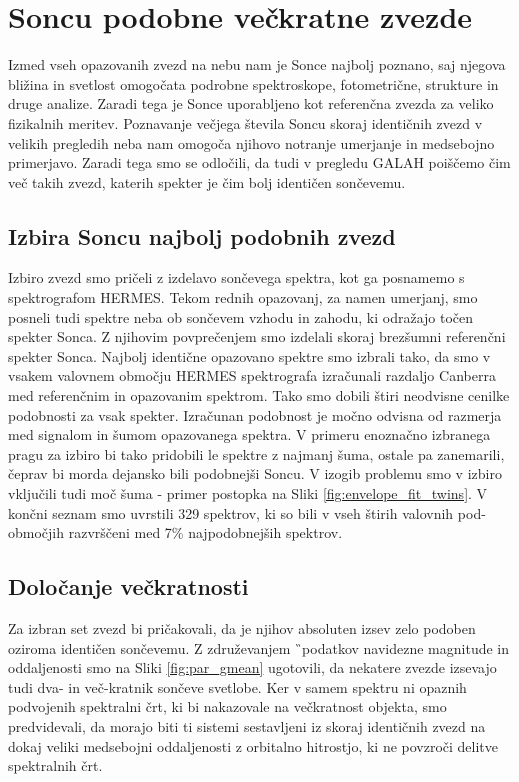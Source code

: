 \section{Soncu podobne večkratne zvezde}
\label{sec:slo_soncevi_veckratniki}
Izmed vseh opazovanih zvezd na nebu nam je Sonce najbolj poznano, saj njegova bližina in svetlost omogočata podrobne spektroskope, fotometrične, strukture in druge analize. Zaradi tega je Sonce uporabljeno kot referenčna zvezda za veliko fizikalnih meritev. Poznavanje večjega števila Soncu skoraj identičnih zvezd v velikih pregledih neba nam omogoča njihovo notranje umerjanje \cite{2010A&A...522A..98M, 2012MNRAS.426..484D} in medsebojno primerjavo. Zaradi tega smo se odločili, da tudi v pregledu GALAH poiščemo čim več takih zvezd, katerih spekter je čim bolj identičen sončevemu.

\subsection{Izbira Soncu najbolj podobnih zvezd}
Izbiro zvezd smo pričeli z izdelavo sončevega spektra, kot ga posnamemo s spektrografom HERMES. Tekom rednih opazovanj, za namen umerjanj, smo posneli tudi spektre neba ob sončevem vzhodu in zahodu, ki odražajo točen spekter Sonca. Z njihovim povprečenjem smo izdelali skoraj brezšumni referenčni spekter Sonca. Najbolj identične opazovano spektre smo izbrali tako, da smo v vsakem valovnem območju HERMES spektrografa izračunali razdaljo Canberra \cite{Lance1967MixedDataCP} med referenčnim in opazovanim spektrom. Tako smo dobili štiri neodvisne cenilke podobnosti za vsak spekter. Izračunan podobnost je močno odvisna od razmerja med signalom in šumom opazovanega spektra. V primeru enoznačno izbranega pragu za izbiro bi tako pridobili le spektre z najmanj šuma, ostale pa zanemarili, čeprav bi morda dejansko bili podobnejši Soncu. V izogib problemu smo v izbiro vključili tudi moč šuma - primer postopka na Sliki \ref{fig:envelope_fit_twins}. V končni seznam smo uvrstili 329 spektrov, ki so bili v vseh štirih valovnih pod-območjih razvrščeni med 7\% najpodobnejših spektrov.

\subsection{Določanje večkratnosti}
Za izbran set zvezd bi pričakovali, da je njihov absoluten izsev zelo podoben oziroma identičen sončevemu. Z združevanjem \G\ podatkov navidezne magnitude in oddaljenosti \cite{2018AJ....156...58B} smo na Sliki \ref{fig:par_gmean} ugotovili, da nekatere zvezde izsevajo tudi dva- in več-kratnik sončeve svetlobe. Ker v samem spektru ni opaznih podvojenih spektralni črt, ki bi nakazovale na večkratnost objekta, smo predvidevali, da morajo biti ti sistemi sestavljeni iz skoraj identičnih zvezd na dokaj veliki medsebojni oddaljenosti z orbitalno hitrostjo, ki ne povzroči delitve spektralnih črt.


